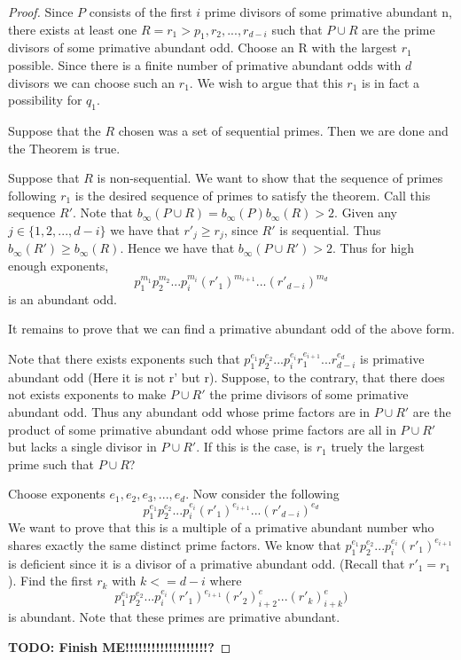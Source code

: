 \documentclass[../paper.tex]{subfiles}
\begin{document}
\begin{proof}
	Since $P$ consists of the first $i$ prime divisors of some 
primative abundant n, there exists at least one
$R = {r_1 > p_1, r_2, ..., r_{d-i}}$ such that $P \cup R$ are the 
prime divisors of some primative abundant odd. Choose an R with the
largest $r_1$ possible. Since there is a finite number of 
primative abundant odds with $d$ divisors we can choose such an
$r_1$. We wish to argue that this $r_1$ is in fact a possibility
for $q_1$.

	Suppose that the $R$ chosen was a set of sequential primes. 
Then we are done and the Theorem is true.

	Suppose that $R$ is non-sequential. We want to show that the 
sequence of primes following $r_1$ is the desired sequence of 
primes to satisfy the theorem. Call this sequence $R'$. Note that
$b_{\infty}(P \cup R) = b_{\infty}(P) b_{\infty}(R) > 2$. Given 
any $j \in \{1, 2, ..., d-i\}$ we have that $r'_j \geq r_j$, since
$R'$ is sequential. Thus $b_{\infty}(R') \geq b_{\infty}(R)$. Hence
we have that $b_{\infty}(P \cup R') > 2$. Thus for high enough 
exponents, 
%
$$p_1^{m_1}  p_2^{m_2} ... p_i^{m_i} (r'_1)^{m_{i+1}} ... (r'_{d-i})^{m_d}$$
%
is an abundant odd.

	It remains to prove that we can find a primative abundant odd 
of the above form.

	Note that there exists exponents such that 
%
$p_1^{e_1}  p_2^{e_2} ... p_i^{e_i} r_1^{e_{i+1}} ... r_{d-i}^{e_d}$
%
is primative abundant odd (Here it is not r' but r). 
Suppose, to the contrary, that there 
does not exists exponents to make $P \cup R'$ the prime divisors 
of some primative abundant odd. Thus any abundant odd whose prime
factors are in $P \cup R'$ are the product of some primative 
abundant odd whose prime factors are all in $P \cup R'$ but lacks
a single divisor in $P \cup R'$. If this is the case, is $r_1$ truely
the largest prime such that $P \cup R$?

Choose exponents $e_1, e_2, e_3, ..., e_d$. Now consider the following
$$p_1^{e_1} p_2^{e_2} ... p_i^{e_i} (r'_1)^{e_{i+1}} ... (r'_{d-i})^{e_d}$$
We want to prove that this is a multiple of a primative abundant 
number who shares exactly the same distinct prime factors. We know 
that $p_1^{e_1} p_2^{e_2} ... p_i^{e_i} (r'_1)^{e_{i+1}}$ is 
deficient since it is a divisor of a primative abundant odd.
(Recall that $r'_1 = r_1$). Find the first $r_k$ with $k <= d - i$
where 
$$p_1^{e_1} p_2^{e_2} ... p_i^{e_i} (r'_1)^{e_{i+1}} (r'_2)^e_{i+2} ... 
(r'_k)^e_{i+k})$$
is abundant. Note that these primes are primative abundant. 

\textbf{TODO: Finish ME!!!!!!!!!!!!!!!!!!!?}

\end{proof}
\end{document}
